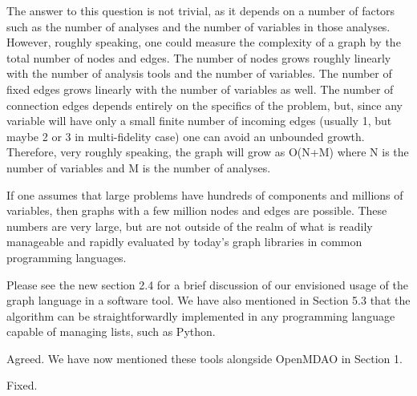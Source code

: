 \documentclass{article} %
\begin{document}

The answer to this question is not trivial, as it depends on a number of factors such as the number of analyses and the number of variables in those analyses. However, roughly speaking, one could measure the complexity of a graph by the total number of nodes and edges. The number of nodes grows roughly linearly with the number of analysis tools and the number of variables. The number of fixed edges grows linearly with the number of variables as well. The number of connection edges depends entirely on the specifics of the problem, but, since any variable will have only a small finite number of incoming edges (usually 1, but maybe 2 or 3 in multi-fidelity case) one can avoid an unbounded growth. Therefore, very roughly speaking, the graph will grow as O(N+M) where N is the number of variables and M is the number of analyses.

If one assumes that large problems have hundreds of components and millions of variables, then graphs with a few million nodes and edges are possible. These numbers are very large, but are not outside of the realm of what is readily manageable and rapidly evaluated by today's graph libraries in common programming languages.


Please see the new section 2.4 for a brief discussion of our envisioned usage
of the graph language in a software tool. We have also mentioned in Section 5.3 that the algorithm can be straightforwardly implemented in any programming language capable of managing lists, such as Python.


Agreed. We have now mentioned these tools alongside OpenMDAO in  Section 1.


Fixed.
\end{document}
